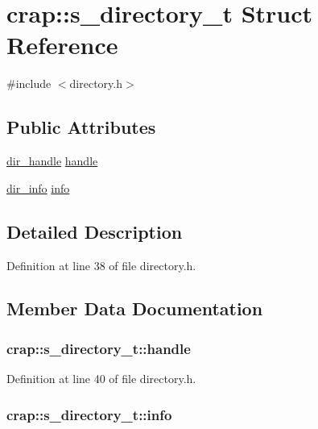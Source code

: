 \hypertarget{structcrap_1_1s__directory__t}{\section{crap\+:\+:s\+\_\+directory\+\_\+t Struct Reference}
\label{structcrap_1_1s__directory__t}
}


{\ttfamily \#include $<$directory.\+h$>$}

\subsection*{Public Attributes}
\begin{DoxyCompactItemize}
\item 
\hyperlink{directory_8h_a6903c6a823657529f2da5d6f05332329}{dir\+\_\+handle} \hyperlink{structcrap_1_1s__directory__t_acd5d86498e69e796777e52d597e92a1c}{handle}
\item 
\hyperlink{directory_8h_a807975fd00b38b5fd8ce43bad2b4825a}{dir\+\_\+info} \hyperlink{structcrap_1_1s__directory__t_a2ab0c80ea970953293688d2851c57e89}{info}
\end{DoxyCompactItemize}


\subsection{Detailed Description}


Definition at line 38 of file directory.\+h.



\subsection{Member Data Documentation}
\hypertarget{structcrap_1_1s__directory__t_acd5d86498e69e796777e52d597e92a1c}{
\subsubsection[{handle}]{ crap\+::s\+\_\+directory\+\_\+t\+::handle}}\label{structcrap_1_1s__directory__t_acd5d86498e69e796777e52d597e92a1c}


Definition at line 40 of file directory.\+h.

\hypertarget{structcrap_1_1s__directory__t_a2ab0c80ea970953293688d2851c57e89}{
\subsubsection[{info}]{ crap\+::s\+\_\+directory\+\_\+t\+::info}}\label{structcrap_1_1s__directory__t_a2ab0c80ea970953293688d2851c57e89}


